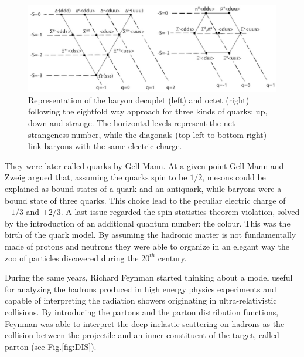\begin{figure}[!ht]
\begin{center}
\includegraphics[width=0.8\linewidth]{Chapters/Introduction/Figs/eightfold_way.pdf}
\caption{Representation of the baryon decuplet (left) and octet (right) following the eightfold way approach for three kinds of quarks: up, down and strange. The horizontal levels represent the net strangeness number, while the diagonals (top left to bottom right) link baryons with the same electric charge.}
\label{fig:gelmann}
\end{center}
\end{figure}

They were later called quarks by Gell-Mann.
At a given point Gell-Mann and Zweig argued that, assuming the quarks spin to be $1/2$, mesons could be explained as bound states of a quark and an antiquark, while baryons were a bound state of three quarks.
This choice lead to the peculiar electric charge of $\pm1/3$ and $\pm2/3$.
A last issue regarded the spin statistics theorem violation, solved by the introduction of an additional quantum number: the colour.
This was the birth of the quark model.
By assuming the hadronic matter is not fundamentally made of protons and neutrons they were able to organize in an elegant way the zoo of particles discovered during the $20^{th}$ century.

During the same years, Richard Feynman started thinking about a model useful for analyzing the hadrons produced in high energy physics experiments and capable of interpreting the radiation showers originating in ultra-relativistic collisions.
By introducing the partons and the parton distribution functions, Feynman was able to interpret the deep inelastic scattering on hadrons as the collision between the projectile and an inner constituent of the target, called parton (see Fig.\ref{fig:DIS}).

